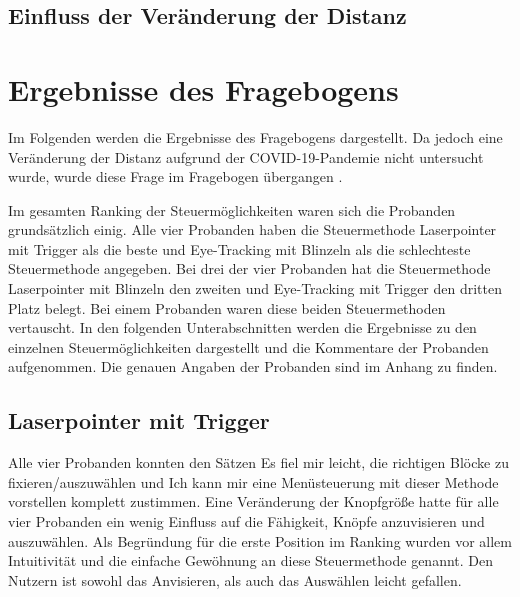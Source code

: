 \subsection{Einfluss der Veränderung der Distanz}

\section{Ergebnisse des Fragebogens}
Im Folgenden werden die Ergebnisse des Fragebogens dargestellt. Da jedoch eine Veränderung der Distanz aufgrund der COVID-19-Pandemie nicht untersucht wurde, wurde diese Frage im Fragebogen übergangen . 

Im gesamten Ranking der Steuermöglichkeiten waren sich die Probanden grundsätzlich einig. Alle vier Probanden haben die Steuermethode Laserpointer mit Trigger als die beste und Eye-Tracking mit Blinzeln als die schlechteste Steuermethode angegeben. Bei drei der vier Probanden hat die Steuermethode Laserpointer mit Blinzeln den zweiten und Eye-Tracking mit Trigger den dritten Platz belegt. Bei einem Probanden waren diese beiden Steuermethoden vertauscht. In den folgenden Unterabschnitten werden die Ergebnisse zu den einzelnen Steuermöglichkeiten dargestellt und die Kommentare der Probanden aufgenommen. Die genauen Angaben der Probanden sind im Anhang  zu finden.
\subsection{Laserpointer mit Trigger}
Alle vier Probanden konnten den Sätzen \glqq Es fiel mir leicht, die richtigen Blöcke zu fixieren/auszuwählen\grqq{} und \glqq Ich kann mir eine Menüsteuerung mit dieser Methode vorstellen\grqq{} komplett zustimmen. Eine Veränderung der Knopfgröße hatte für alle vier Probanden \glqq ein wenig\grqq{} Einfluss auf die Fähigkeit, Knöpfe anzuvisieren und auszuwählen. Als Begründung für die erste Position im Ranking wurden vor allem Intuitivität und die einfache Gewöhnung an diese Steuermethode genannt. Den Nutzern ist sowohl das Anvisieren, als auch das Auswählen leicht gefallen. 

